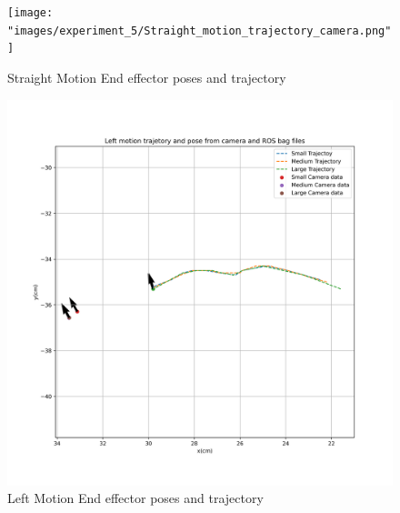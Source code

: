     
    \begin{figure}[H] 
            \centering \texttt{[image: "images/experiment\_5/Straight\_motion\_trajectory\_camera.png"]}
            \caption{{Straight Motion End effector poses and trajectory}}
            \label{fig:exp05-Straight Motion End effector poses and trajectory}
        \end{figure}
        
    
    \begin{figure}[H] 
            \centering \includegraphics[width=\textwidth]{"images/experiment_5/Left_motion_trajectory_camera.png"}
            \caption{{Left Motion End effector poses and trajectory}}
            \label{fig:exp05-Left Motion End effector poses and trajectory}
        \end{figure}
        

